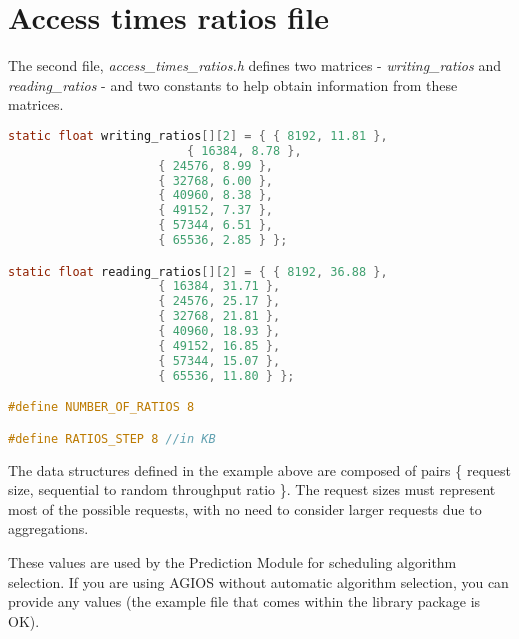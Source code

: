 \section{Access times ratios file}

The second file, \emph{access\_times\_ratios.h} defines two matrices - \emph{writing\_ratios} and \emph{reading\_ratios} - and two constants to help obtain information from these matrices.

\begin{lstlisting}[language=C]
static float writing_ratios[][2] = { { 8192, 11.81 },
			             { 16384, 8.78 },
				     { 24576, 8.99 },
				     { 32768, 6.00 },
				     { 40960, 8.38 },
				     { 49152, 7.37 },
				     { 57344, 6.51 },
				     { 65536, 2.85 } };

static float reading_ratios[][2] = { { 8192, 36.88 },
				     { 16384, 31.71 },
				     { 24576, 25.17 },
				     { 32768, 21.81 },
				     { 40960, 18.93 },
				     { 49152, 16.85 },
				     { 57344, 15.07 },
				     { 65536, 11.80 } };

#define NUMBER_OF_RATIOS 8

#define RATIOS_STEP 8 //in KB
\end{lstlisting} 

The data structures defined in the example above are composed of pairs \{ request size, sequential to random throughput ratio \}. The request sizes must represent most of the possible requests, with no need to consider larger requests due to aggregations.

These values are used by the Prediction Module for scheduling algorithm selection. If you are using AGIOS without automatic algorithm selection, you can provide any values (the example file that comes within the library package is OK).



